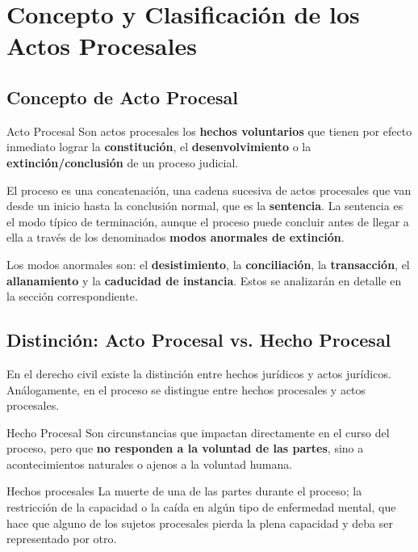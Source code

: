 \documentclass[12pt,oneside]{book}
\begin{document}
\chapter{Concepto y Clasificación de los Actos Procesales}

\section{Concepto de Acto Procesal}

\begin{definition}{Acto Procesal}
Son actos procesales los \textbf{hechos voluntarios} que tienen por efecto inmediato lograr la \textbf{constitución}, el \textbf{desenvolvimiento} o la \textbf{extinción/conclusión} de un proceso judicial.
\end{definition}

El proceso es una concatenación, una cadena sucesiva de actos procesales que van desde un inicio hasta la conclusión normal, que es la \textbf{sentencia}. La sentencia es el modo típico de terminación, aunque el proceso puede concluir antes de llegar a ella a través de los denominados \textbf{modos anormales de extinción}.

Los modos anormales son: el \textbf{desistimiento}, la \textbf{conciliación}, la \textbf{transacción}, el \textbf{allanamiento} y la \textbf{caducidad de instancia}. Estos se analizarán en detalle en la sección correspondiente.

\section{Distinción: Acto Procesal vs. Hecho Procesal}

En el derecho civil existe la distinción entre hechos jurídicos y actos jurídicos. Análogamente, en el proceso se distingue entre hechos procesales y actos procesales.

\begin{definition}{Hecho Procesal}
Son circunstancias que impactan directamente en el curso del proceso, pero que \textbf{no responden a la voluntad de las partes}, sino a acontecimientos naturales o ajenos a la voluntad humana.
\end{definition}

\begin{example}{Hechos procesales}
La muerte de una de las partes durante el proceso; la restricción de la capacidad o la caída en algún tipo de enfermedad mental, que hace que alguno de los sujetos procesales pierda la plena capacidad y deba ser representado por otro.
\end{example}
\end{document}
